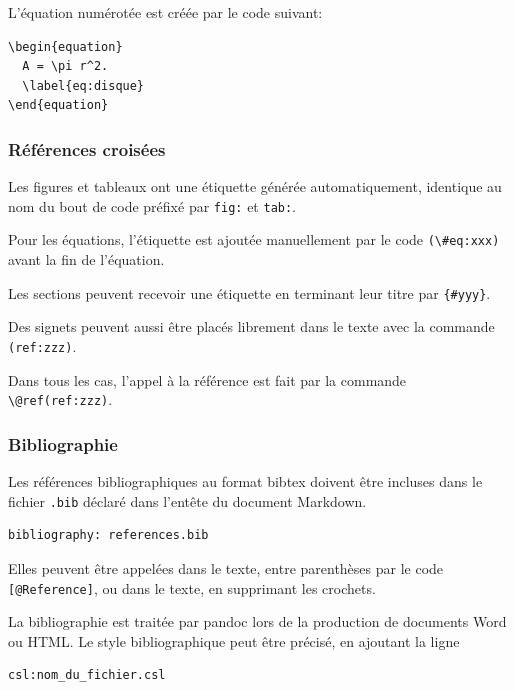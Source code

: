 \documentclass[
  12pt,
  french,
  a4paper,
  extrafontsizes,onecolumn,openright
  ]{memoir}
\begin{document}
L'équation numérotée est créée par le code suivant:

\begin{verbatim}
\begin{equation}
  A = \pi r^2.
  \label{eq:disque}
\end{equation}
\end{verbatim}

\hypertarget{ruxe9fuxe9rences-croisuxe9es}{%
\subsubsection{Références croisées}\label{ruxe9fuxe9rences-croisuxe9es}}

Les figures et tableaux ont une étiquette générée automatiquement, identique au nom du bout de code préfixé par \texttt{fig:} et \texttt{tab:}.

Pour les équations, l'étiquette est ajoutée manuellement par le code \texttt{(\textbackslash{}\#eq:xxx)} avant la fin de l'équation.

Les sections peuvent recevoir une étiquette en terminant leur titre par \texttt{\{\#yyy\}}.

Des signets peuvent aussi être placés librement dans le texte avec la commande \texttt{(ref:zzz)}.

Dans tous les cas, l'appel à la référence est fait par la commande \texttt{\textbackslash{}@ref(ref:zzz)}.

\hypertarget{bibliographie}{%
\subsubsection{Bibliographie}\label{bibliographie}}

Les références bibliographiques au format bibtex doivent être incluses dans le fichier \texttt{.bib} déclaré dans l'entête du document Markdown.

\begin{verbatim}
bibliography: references.bib
\end{verbatim}

Elles peuvent être appelées dans le texte, entre parenthèses par le code \texttt{{[}@Reference{]}}, ou dans le texte, en supprimant les crochets.

La bibliographie est traitée par pandoc lors de la production de documents Word ou HTML.
Le style bibliographique peut être précisé, en ajoutant la ligne

\begin{verbatim}
csl:nom_du_fichier.csl
\end{verbatim}
\end{document}
